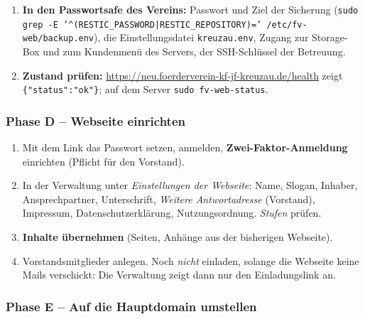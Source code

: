 \documentclass[a4paper,fontsize=10pt]{scrartcl}
\newcommand*{\cmd}[1]{\texttt{#1}}
\newcommand*{\pfad}[1]{\texttt{#1}}
\newcommand*{\erledigt}{\makebox[1.4em][l]{\setlength{\fboxsep}{0pt}\fbox{\rule{0pt}{0.7em}\hspace{0.7em}}}}
\begin{document}
\begin{enumerate}[resume]
\begin{befehl}
ssh fkjs@neu.foerderverein-kf-jf-kreuzau.de
sudo fv-web-backup          # endet mit "Sicherung erfolgreich."
sudo fv-web-restore -t      # Wiederherstellungstest, ändert nichts
\end{befehl}
  \item \erledigt\textbf{In den Passwortsafe des Vereins:} Passwort und Ziel der Sicherung
        (\cmd{sudo grep -E '\^{}(RESTIC\_PASSWORD|RESTIC\_REPOSITORY)=' /etc/fv-web/backup.env}),
        die Einstellungsdatei \pfad{kreuzau.env}, Zugang zur Storage-Box und zum
        Kundenmenü des Servers, der SSH-Schlüssel der Betreuung.
  \item \erledigt\textbf{Zustand prüfen:} \url{https://neu.foerderverein-kf-jf-kreuzau.de/health}
        zeigt \cmd{\{"status":"ok"\}}; auf dem Server \cmd{sudo fv-web-status}.
\end{enumerate}

\subsubsection*{Phase D -- Webseite einrichten}

\begin{enumerate}[resume]
  \item \erledigt Mit dem Link das Passwort setzen, anmelden, \textbf{Zwei-Faktor-Anmeldung}
        einrichten (Pflicht für den Vorstand).
  \item \erledigt In der Verwaltung unter \emph{Einstellungen der Webseite}: Name, Slogan,
        Inhaber, Ansprechpartner, Unterschrift, \emph{Weitere Antwortadresse}
        (Vorstand), Impressum, Datenschutzerklärung, Nutzungsordnung. \emph{Stufen}
        prüfen.
  \item \erledigt\textbf{Inhalte übernehmen} (Seiten, Anhänge aus der bisherigen Webseite).
  \item \erledigt Vorstandsmitglieder anlegen. Noch \emph{nicht} einladen, solange die
        Webseite keine Mails verschickt: Die Verwaltung zeigt dann nur den
        Einladungslink an.
\end{enumerate}

\subsubsection*{Phase E -- Auf die Hauptdomain umstellen}
\end{document}
